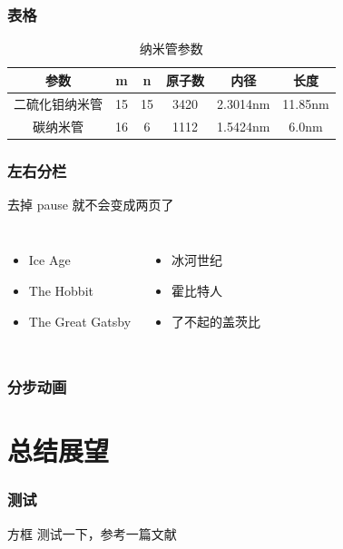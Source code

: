 \documentclass[14pt, AutoFakeBold]{ldr}
\begin{document}
\begin{frame}
  \frametitle{表格}
  \begin{table}[H]
    \centering
    \caption{纳米管参数}
    \begin{tabular}{cccccc} %
        \toprule
        参数 & m  & n  & 原子数 & 内径     & 长度    \\
        \midrule
        二硫化钼纳米管  & 15 & 15 & 3420   & 2.3014nm & 11.85nm \\
        碳纳米管  & 16 & 6  & 1112   & 1.5424nm & 6.0nm   \\
        \bottomrule
    \end{tabular}
    \label{tbl_mcnt_nanotube}
\end{table}
\end{frame}

\begin{frame}
\frametitle{左右分栏}
去掉 pause  就不会变成两页了
  \begin{columns}

    \begin{itemize}
    \item Ice Age
    \item The Hobbit
    \item The Great Gatsby
    \end{itemize}
  \pause
    \begin{itemize}
    \item 冰河世纪
    \item 霍比特人
    \item 了不起的盖茨比
    \end{itemize}
  \end{columns}
\end{frame}





\begin{frame}
  \frametitle{分步动画}




\end{frame}






\section{总结展望}

\begin{frame}
  \frametitle{测试}

  \begin{block}{方框}
    测试一下，参考一篇文献
  \end{block}

\end{frame}
\end{document}
